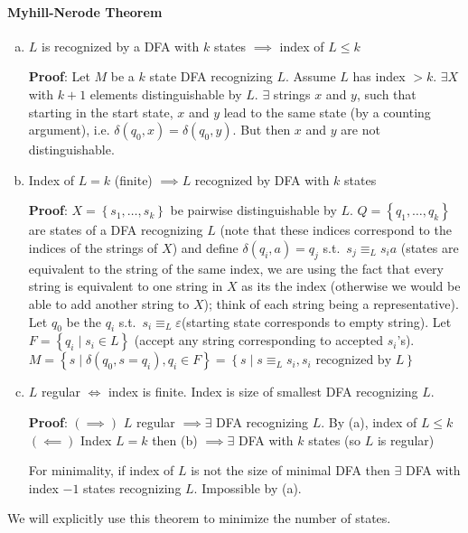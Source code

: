 \documentclass[12 pt]{article}
\begin{document}
\paragraph{Myhill-Nerode Theorem}
\begin{enumerate}[(a)]
\item $L$ is recognized by a DFA with $k$ states $\implies$ index of
  $L \leq k$

  \textbf{Proof}: Let $M$ be a $k$ state DFA recognizing $L$. Assume
  $L$ has index $> k$. $\exists X$ with $k+1$ elements distinguishable
  by $L$. $\exists$ strings $x$ and $y$, such that starting in
  the start state, $x$ and $y$ lead to the same state (by a counting
  argument), i.e. $\delta(q_0, x) = \delta(q_0, y)$. But then $x$ and
  $y$ are not distinguishable. \lightning
\item Index of $L = k$ (finite) $\implies L$ recognized by DFA with
  $k$ states

  \textbf{Proof}: $X = \left\{s_1, \ldots, s_k\right\}$ be pairwise
  distinguishable by $L$. $Q = \left\{q_1, \ldots, q_k\right\}$ are
  states of a DFA recognizing $L$ (note that these indices correspond
  to the indices of the strings of $X$) and define $\delta(q_i, a) = q_j$
  s.t.\ $s_j \equiv_L s_ia$ (states are equivalent to the string of
  the same index, we are using the fact that every string is
  equivalent to one string in $X$ as its the index (otherwise we would
  be able to add another string to $X$); think of each
  string being a representative). Let $q_0$ be the $q_i$ s.t.\ $s_i
  \equiv_L \varepsilon$(starting state corresponds to empty string). Let $F = \left\{q_i \mid s_i \in
    L\right\}$ (accept any string corresponding to accepted
  $s_i$'s). $M = \left\{s \mid \delta(q_0, s = q_i), q_i \in F\right\}
  = \left\{s \mid s \equiv_L s_i, s_i \text{ recognized by }L\right\}$
\item $L$ regular $\iff$ index is finite. Index is size of smallest
  DFA recognizing $L$.

  \textbf{Proof}: $(\implies)$ $L$ regular $\implies \exists$ DFA
  recognizing $L$. By (a), index of $L \leq k$
  \\ $(\impliedby)$ Index $L = k$ then (b) $\implies \exists$ DFA with
  $k$ states (so $L$ is regular)

  For minimality, if index of $L$ is not the size of minimal DFA then
  $\exists$ DFA with index $- 1$ states recognizing $L$. Impossible by (a).
\end{enumerate}
We will explicitly use this theorem to minimize the number of states.
\end{document}
